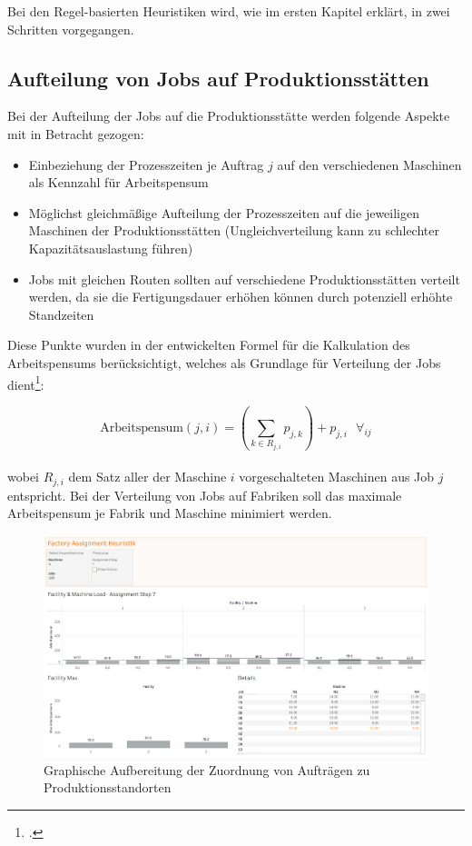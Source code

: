 \documentclass[final, english, ngerman, a4paper, 12pt, %
numbers=noenddot,
cd=true,
cdfont=false,cdfont=nohead,cdfont=nodin,
cdmath=false,
cdhead=false,
cdfoot=true,
cdcover=monochrome,
cdgeometry=symmetric,
declaration=heading,
declaration=notoc,
abstract=heading,
]{tudscrreprt}
\begin{document}
Bei den Regel-basierten Heuristiken wird, wie im ersten Kapitel erklärt, in zwei Schritten vorgegangen. 

\subsection{Aufteilung von Jobs auf Produktionsstätten}
\label{sec:aufteilung}
Bei der Aufteilung der Jobs auf die Produktionsstätte werden folgende Aspekte mit in Betracht gezogen:

\begin{itemize}
	\item Einbeziehung der Prozesszeiten je Auftrag $j$ auf den verschiedenen Maschinen als Kennzahl für Arbeitspensum
	\item Möglichst gleichmäßige Aufteilung der Prozesszeiten auf die jeweiligen Maschinen der Produktionsstätten (Ungleichverteilung kann zu schlechter Kapazitätsauslastung führen)
	\item Jobs mit gleichen Routen sollten auf verschiedene Produktionsstätten verteilt werden, da sie die Fertigungsdauer erhöhen können durch potenziell erhöhte Standzeiten
\end{itemize}

\noindent
Diese Punkte wurden in der entwickelten Formel für die Kalkulation des Arbeitspensums berücksichtigt, welches als Grundlage für Verteilung der Jobs dient\footcite[S. 7756]{djs-modeling}:

\begin{equation}
\text{Arbeitspensum}(j,i)=\left(\sum_{k \in R_{j,i}} p_{j,k} \right) + p_{j,i} \text{  } \forall_{i j}
\end{equation}\\
wobei $R_{j,i}$ dem Satz aller der Maschine $i$ vorgeschalteten Maschinen aus Job $j$ entspricht. Bei der Verteilung von Jobs auf Fabriken soll das maximale Arbeitspensum je Fabrik und Maschine minimiert werden.

\begin{figure}[h]
	\centering
	\includegraphics[width=\textwidth]{./settings/assignment}
	\caption[Zuordnung von Aufträgen zu Produktionsstandorten]{Graphische Aufbereitung der Zuordnung von Aufträgen zu Produktionsstandorten\footnotemark}\label{fig:assignment}
\end{figure}
\end{document}
